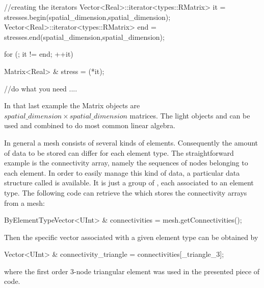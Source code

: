 \begin{cpp}
  //creating the iterators
  Vector<Real>::iterator<types::RMatrix> it  = stresses.begin(spatial_dimension,spatial_dimension);
  Vector<Real>::iterator<types::RMatrix> end = stresses.end(spatial_dimension,spatial_dimension);

  for (; it != end; ++it){
    Matrix<Real> & stress = (*it);

    //do what you need
    ....

  }
\end{cpp}
In that last example the Matrix objects are
$spatial\_dimension \times spatial\_dimension$ matrices.
The light objects  and  can be used and combined
to do most common linear algebra.

In general a mesh consists of several kinds of elements. Consequently the
amount of data to be stored can differ for each element type. The straightforward
example is the connectivity array, namely the sequences of nodes belonging to
each element. In order to easily manage this kind of data, a
particular data structure called  is available.
It is just a group of , each associated to an element
type. The following code can retrieve the 
which stores the connectivity arrays from a mesh:
\begin{cpp}
  ByElementTypeVector<UInt> & connectivities = mesh.getConnectivities();
\end{cpp}
Then the specific vector associated with a given element type can be
obtained by
\begin{cpp}
  Vector<UInt> & connectivity_triangle = connectivities[_triangle_3];
\end{cpp}
where the first order 3-node triangular element was used in the presented
piece of code.
